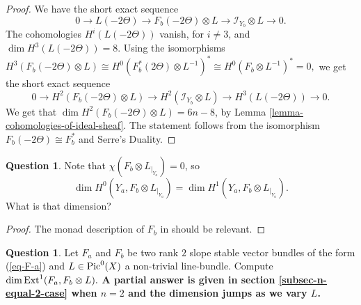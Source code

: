 \documentclass[12pt]{amsart}
\numberwithin{equation}{subsection}
\theoremstyle{plain}
\theoremstyle{definition}
\newtheorem{question}[thm]{Question}
\newcommand{\restricted}[2]{#1_{\mid_{#2}}}
\newcommand{\Pic}{{\rm Pic}}
\newcommand{\Ext}{{\rm Ext}}
\newcommand{\Ideal}[1]{{\mathcal I}_{#1}}
\begin{document}
{\begin{proof}
We have the short exact sequence
\[
0\rightarrow L(-2\Theta)\rightarrow F_b(-2\Theta)\otimes L \rightarrow \Ideal{Y_b}\otimes L \rightarrow 0.
\]
The cohomologies $H^i(L(-2\Theta))$ vanish, for $i\neq 3$, and $\dim H^3(L(-2\Theta))=8$. Using the isomorphisms
$H^3(F_b(-2\Theta)\otimes L)\cong H^0(F_b^*(2\Theta)\otimes L^{-1})^*\cong H^0(F_b\otimes L^{-1})^*=0,$
we get the short exact sequence
\[
0\rightarrow H^2(F_b(-2\Theta)\otimes L) \rightarrow H^2(\Ideal{Y_b}\otimes L) \rightarrow H^3(L(-2\Theta))\rightarrow 0.
\]
We get that $\dim H^2(F_b(-2\Theta)\otimes L)=6n-8$, by Lemma \ref{lemma-cohomologies-of-ideal-sheaf}.
The statement follows from the isomorphism $F_b(-2\Theta)\cong F_b^*$ and Serre's Duality.
\end{proof}

\begin{question}
\label{question-dimenstion-over-Y-a}
Note that $\chi\left(F_b\otimes \restricted{L}{Y_a}\right)=0$, so 
\[
\dim H^0(Y_a,F_b\otimes \restricted{L}{Y_a})=\dim H^1(Y_a,F_b\otimes \restricted{L}{Y_a}).
\]
What is that dimension?
\end{question}

\begin{proof}
The monad description of $F_b$ in \cite[Prop. 3.2]{gulbrandsen} should be relevant. 
\end{proof}


\begin{question}
Let $F_a$ and $F_b$ be two rank $2$ slope stable vector bundles of the form (\ref{eq-F-a})
and $L\in \Pic^0(X)$ a non-trivial line-bundle. Compute
$\dim\Ext^1(F_a,F_b\otimes L).$ 
{\bf A partial answer is given in section \ref{subsec-n-equal-2-case} when $n=2$ and the dimension jumps as we vary $L$.}
\end{question}

}
\end{document}
